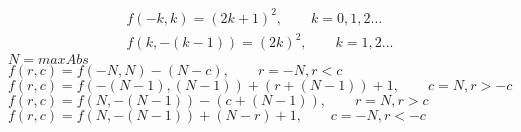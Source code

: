 \documentclass[11pt,a4paper]{article}
\begin{document}
    \begin{gather}
    f(-k,k) = (2k+1)^2 , \qquad k=0,1,2...\\
    f(k,-(k-1)) = (2k)^2, \qquad k=1,2...
    \end{gather}
    $N=maxAbs$  \\
    $f(r,c)=f(-N,N)-(N-c), \qquad r=-N,r<c$  \\ %
    $f(r,c)=f(-(N-1),(N-1))+(r+(N-1))+1, \qquad c=N,r>-c$    \\ %
    $f(r,c)=f(N,-(N-1))-(c+(N-1)), \qquad r=N,r>c$    \\ %
    $f(r,c)=f(N,-(N-1))+(N-r)+1, \qquad c=-N,r<-c$    \\ %
\end{document}
